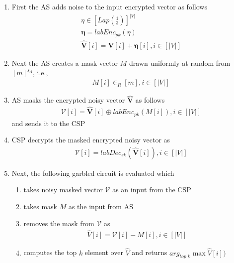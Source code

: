 \begin{enumerate}
\begin{enumerate}
\item First the \textsf{AS} adds noise to the input encrypted vector as follows \begin{gather*} \eta \in [Lap(\frac{1}{\epsilon})]^{|V|}\\\boldsymbol{\eta}=labEnc_{pk}(\eta)\\\mathbf{\hat{{V}}}[i]=\mathbf{V}[i]+ \boldsymbol{\eta}[i], i \in [|V|] \end{gather*} \item Next the \textsf{AS} creates a mask vector $M$ drawn uniformly at random from $[m]^{s_A}$, i.e.,  \begin{gather*} M[i] \in_R [m], i \in [|V|]\end{gather*} \item \textsf{AS} masks the encrypted noisy vector $\mathbf{\hat{V}}$  as follows \begin{gather*}\boldsymbol{\mathcal{V}}[i]= \mathbf{\hat{V}}[i] \oplus labEnc_{pk}(M[i]), i \in [|V|]\end{gather*} and sends it to the \textsf{CSP} \item \textsf{CSP} decrypts the masked encrypted noisy vector as \begin{gather*}\mathcal{V}[i]=labDec_{sk}(\mathbf{\hat{V}}[i]), i \in [|V|]\end{gather*} \item Next, the following garbled circuit is evaluated which
    \begin{enumerate}[label=\roman*]\item takes noisy masked  vector $\mathcal{V}$ as an input from the \textsf{CSP} \item takes mask $M$ as the input from \textsf{AS}  \item removes the mask from  $\mathcal{V}$  as \begin{gather*} \hat{V}[i]=\mathcal{V}[i]-M[i], i \in [|V|]\end{gather*}  \item computes the top $k$ element over  $\hat{V}$ and returns $arg_{\textit{top k}}\max{\hat{V}[i])}$
    \end{enumerate}
    \end{enumerate}
    \end{enumerate}
